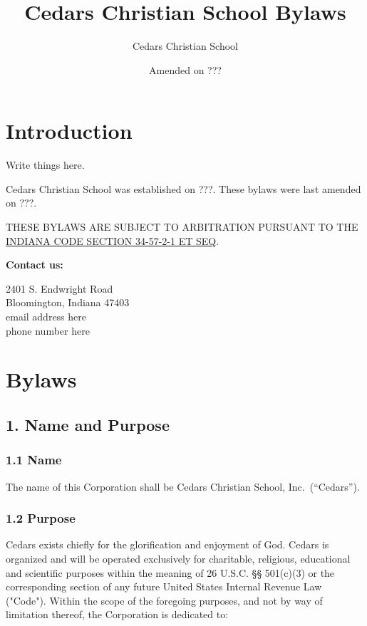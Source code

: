 \documentclass[
]{book}
\title{Cedars Christian School Bylaws}
\author{Cedars Christian School}
\date{Amended on ???}
\begin{document}
\maketitle

{
\hypersetup{linkcolor=}
\setcounter{tocdepth}{1}
\tableofcontents
}
\chapter*{Introduction}\label{introduction}

Write things here.

Cedars Christian School was established on ???. These bylaws were last amended on ???.

THESE BYLAWS ARE SUBJECT TO ARBITRATION PURSUANT TO THE \href{https://iga.in.gov/legislative/laws/2022/ic/titles/034\#34-57-2-1}{INDIANA CODE SECTION 34-57-2-1 ET SEQ}.

\textbf{Contact us:}

2401 S. Endwright Road\\
Bloomington, Indiana 47403\\
email address here\\
phone number here

\mainmatter

\chapter{Bylaws}\label{bylaws}

\section{1. Name and Purpose}\label{name-and-purpose}

\subsection{1.1 Name}\label{name}

The name of this Corporation shall be Cedars Christian School, Inc.~(``Cedars'').

\subsection{1.2 Purpose}\label{purpose}

Cedars exists chiefly for the glorification and enjoyment of God. Cedars is organized and will be operated exclusively for charitable, religious, educational and scientific purposes within the meaning of 26 U.S.C. §§ 501(c)(3) or the corresponding section of any future United States Internal Revenue Law ("Code"). Within the scope of the foregoing purposes, and not by way of limitation thereof, the Corporation is dedicated to:
\end{document}
